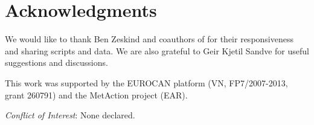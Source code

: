\documentclass{bio}
\begin{document}
\section*{Acknowledgments}

We would like to thank Ben Zeskind and coauthors of \citet{Towfic2014} for their responsiveness and sharing scripts and data.
We are also grateful to Geir Kjetil Sandve for useful suggestions and discussions. 

This work was supported by the EUROCAN platform (VN, FP7/2007-2013, grant 260791) and the MetAction project (EAR).

{\it Conflict of Interest}: None declared.



%


\end{document}
